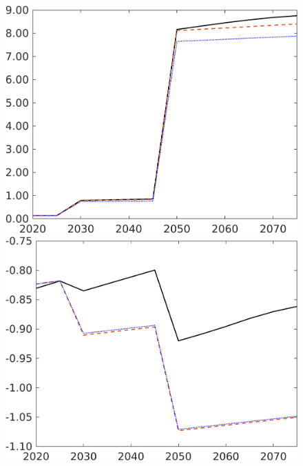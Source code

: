 \begin{figure}[h!!]
\begin{minipage}[]{0.32\textwidth}
	\end{minipage}
	\begin{minipage}[]{0.32\textwidth}
		\includegraphics[width=1\textwidth]{../../codding_model/own_basedOnFried/optimalPol_190722_tidiedUp/figures/all_July22/GFF_DDCompEffOPT_T_NoTaus_pol3_spillover0_noskill0_sep1_xgrowth0_etaa0.79_lgd0_lff0.png}
	\end{minipage}
	\begin{minipage}[]{0.32\textwidth}
		\includegraphics[width=1\textwidth]{../../codding_model/own_basedOnFried/optimalPol_190722_tidiedUp/figures/all_July22/SWF_DDCompEffOPT_T_NoTaus_pol3_spillover0_noskill0_sep1_xgrowth0_etaa0.79_lgd0_lff0.png}
	\end{minipage}
\end{figure}

